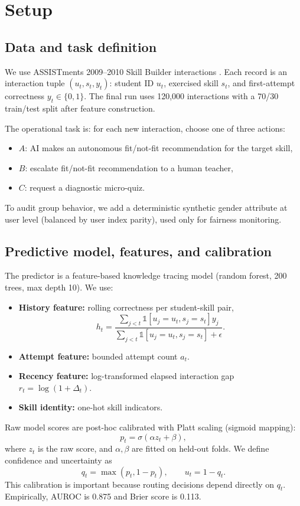 \documentclass{article}
\begin{document}
\section{Setup}
\subsection{Data and task definition}
We use ASSISTments 2009--2010 Skill Builder interactions \citep{assistments2009}. Each record is an interaction tuple \((u_t, s_t, y_t)\): student ID \(u_t\), exercised skill \(s_t\), and first-attempt correctness \(y_t\in\{0,1\}\). The final run uses 120{,}000 interactions with a 70/30 train/test split after feature construction.

The operational task is: for each new interaction, choose one of three actions:
\begin{itemize}
\item \(A\): AI makes an autonomous fit/not-fit recommendation for the target skill,
\item \(B\): escalate fit/not-fit recommendation to a human teacher,
\item \(C\): request a diagnostic micro-quiz.
\end{itemize}
To audit group behavior, we add a deterministic synthetic gender attribute at user level (balanced by user index parity), used only for fairness monitoring.

\subsection{Predictive model, features, and calibration}
The predictor is a feature-based knowledge tracing model (random forest, 200 trees, max depth 10). We use:
\begin{itemize}
\item \textbf{History feature:} rolling correctness per student-skill pair,
\[
h_t=\frac{\sum_{j<t}\mathbb{1}[u_j=u_t, s_j=s_t]y_j}{\sum_{j<t}\mathbb{1}[u_j=u_t, s_j=s_t]+\epsilon}.
\]
\item \textbf{Attempt feature:} bounded attempt count \(a_t\).
\item \textbf{Recency feature:} log-transformed elapsed interaction gap \(r_t=\log(1+\Delta_t)\).
\item \textbf{Skill identity:} one-hot skill indicators.
\end{itemize}

Raw model scores are post-hoc calibrated with Platt scaling (sigmoid mapping):
\[
p_t = \sigma(\alpha z_t + \beta),
\]
where \(z_t\) is the raw score, and \(\alpha,\beta\) are fitted on held-out folds. We define confidence and uncertainty as
\[
q_t=\max(p_t,1-p_t), \qquad u_t=1-q_t.
\]
This calibration is important because routing decisions depend directly on \(q_t\). Empirically, AUROC is 0.875 and Brier score is 0.113.
\end{document}
